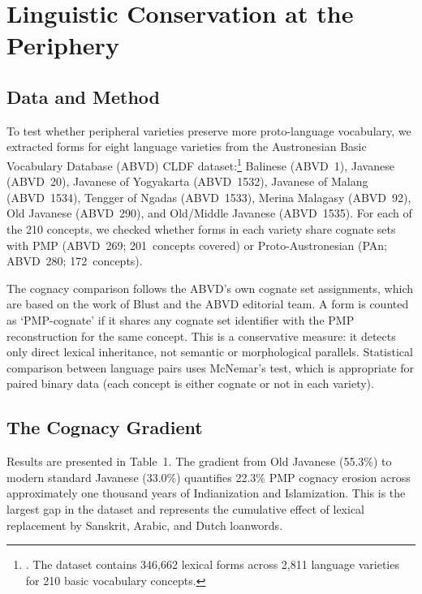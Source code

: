 \documentclass[12pt,a4paper]{article}
\begin{document}
\section{Linguistic Conservation at the Periphery}
\label{sec:linguistic}

\subsection{Data and Method}
\label{sec:cognacy}

To test whether peripheral varieties preserve more proto-language vocabulary, we extracted forms for eight language varieties from the Austronesian Basic Vocabulary Database (ABVD) CLDF dataset:\footnote{\autocite{greenhill2008abvd}. The dataset contains 346,662 lexical forms across 2,811 language varieties for 210 basic vocabulary concepts.} Balinese (ABVD~1), Javanese (ABVD~20), Javanese of Yogyakarta (ABVD~1532), Javanese of Malang (ABVD~1534), Tengger of Ngadas (ABVD~1533), Merina Malagasy (ABVD~92), Old Javanese (ABVD~290), and Old/Middle Javanese (ABVD~1535). For each of the 210 concepts, we checked whether forms in each variety share cognate sets with PMP (ABVD~269; 201~concepts covered) or Proto-Austronesian (PAn; ABVD~280; 172~concepts).

The cognacy comparison follows the ABVD's own cognate set assignments, which are based on the work of Blust and the ABVD editorial team. A form is counted as `PMP-cognate' if it shares any cognate set identifier with the PMP reconstruction for the same concept. This is a conservative measure: it detects only direct lexical inheritance, not semantic or morphological parallels. Statistical comparison between language pairs uses McNemar's test, which is appropriate for paired binary data (each concept is either cognate or not in each variety).

\subsection{The Cognacy Gradient}

Results are presented in Table~1. The gradient from Old Javanese (55.3\%) to modern standard Javanese (33.0\%) quantifies 22.3\% PMP cognacy erosion across approximately one thousand years of Indianization and Islamization. This is the largest gap in the dataset and represents the cumulative effect of lexical replacement by Sanskrit, Arabic, and Dutch loanwords.
\end{document}
